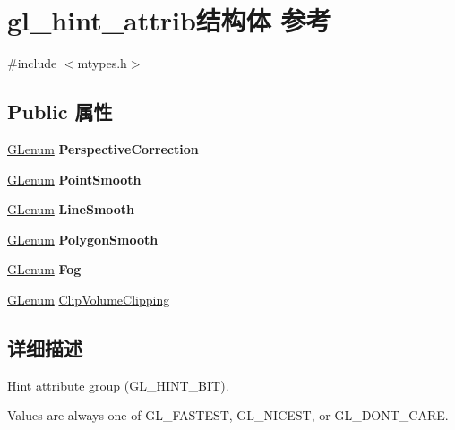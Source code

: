 \hypertarget{structgl__hint__attrib}{}\section{gl\+\_\+hint\+\_\+attrib结构体 参考}
\label{structgl__hint__attrib}


{\ttfamily \#include $<$mtypes.\+h$>$}

\subsection*{Public 属性}
\begin{DoxyCompactItemize}
\item 
\mbox{\label{structgl__hint__attrib_a670b8ea8fce2a26b81c6ff38638ebeab}} 
\hyperlink{interfacevoid}{G\+Lenum} {\bfseries Perspective\+Correction}
\item 
\mbox{\label{structgl__hint__attrib_aae42130264e7e3c1146d432802d093a2}} 
\hyperlink{interfacevoid}{G\+Lenum} {\bfseries Point\+Smooth}
\item 
\mbox{\label{structgl__hint__attrib_a0f74b965344dc1496c4ecf890e9fe3ff}} 
\hyperlink{interfacevoid}{G\+Lenum} {\bfseries Line\+Smooth}
\item 
\mbox{\label{structgl__hint__attrib_a7e821167bb78389fa39364e7f2ed7870}} 
\hyperlink{interfacevoid}{G\+Lenum} {\bfseries Polygon\+Smooth}
\item 
\mbox{\label{structgl__hint__attrib_a68cdaf13ca7e22a1f39bb050f0a711cf}} 
\hyperlink{interfacevoid}{G\+Lenum} {\bfseries Fog}
\item 
\hyperlink{interfacevoid}{G\+Lenum} \hyperlink{structgl__hint__attrib_ab4b448936c591004af1a9e116af498b0}{Clip\+Volume\+Clipping}
\end{DoxyCompactItemize}


\subsection{详细描述}
Hint attribute group (G\+L\+\_\+\+H\+I\+N\+T\+\_\+\+B\+IT).

Values are always one of G\+L\+\_\+\+F\+A\+S\+T\+E\+ST, G\+L\+\_\+\+N\+I\+C\+E\+ST, or G\+L\+\_\+\+D\+O\+N\+T\+\_\+\+C\+A\+RE. 

